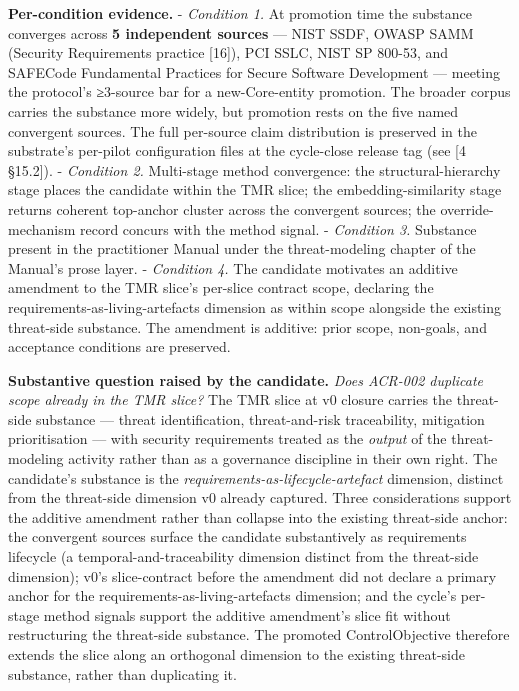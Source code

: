 \documentclass[
]{article}
\begin{document}
\textbf{Per-condition evidence.} - \emph{Condition 1.} At promotion time
the substance converges across \textbf{5 independent sources} --- NIST
SSDF, OWASP SAMM (Security Requirements practice {[}16{]}), PCI SSLC,
NIST SP 800-53, and SAFECode Fundamental Practices for Secure Software
Development --- meeting the protocol's ≥3-source bar for a
new-Core-entity promotion. The broader corpus carries the substance more
widely, but promotion rests on the five named convergent sources. The
full per-source claim distribution is preserved in the substrate's
per-pilot configuration files at the cycle-close release tag (see {[}4
§15.2{]}). - \emph{Condition 2.} Multi-stage method convergence: the
structural-hierarchy stage places the candidate within the TMR slice;
the embedding-similarity stage returns coherent top-anchor cluster
across the convergent sources; the override-mechanism record concurs
with the method signal. - \emph{Condition 3.} Substance present in the
practitioner Manual under the threat-modeling chapter of the Manual's
prose layer. - \emph{Condition 4.} The candidate motivates an additive
amendment to the TMR slice's per-slice contract scope, declaring the
requirements-as-living-artefacts dimension as within scope alongside the
existing threat-side substance. The amendment is additive: prior scope,
non-goals, and acceptance conditions are preserved.

\textbf{Substantive question raised by the candidate.} \emph{Does
ACR-002 duplicate scope already in the TMR slice?} The TMR slice at v0
closure carries the threat-side substance --- threat identification,
threat-and-risk traceability, mitigation prioritisation --- with
security requirements treated as the \emph{output} of the
threat-modeling activity rather than as a governance discipline in their
own right. The candidate's substance is the
\emph{requirements-as-lifecycle-artefact} dimension, distinct from the
threat-side dimension v0 already captured. Three considerations support
the additive amendment rather than collapse into the existing
threat-side anchor: the convergent sources surface the candidate
substantively as requirements lifecycle (a temporal-and-traceability
dimension distinct from the threat-side dimension); v0's slice-contract
before the amendment did not declare a primary anchor for the
requirements-as-living-artefacts dimension; and the cycle's per-stage
method signals support the additive amendment's slice fit without
restructuring the threat-side substance. The promoted ControlObjective
therefore extends the slice along an orthogonal dimension to the
existing threat-side substance, rather than duplicating it.
\end{document}
